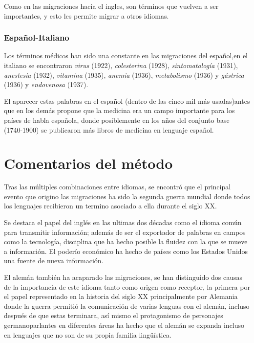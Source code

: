 Como en las migraciones hacia el ingles, son términos que vuelven a ser importantes,  y esto les permite migrar a otros idiomas. 


\subsubsection*{Español-Italiano}%

Los términos médicos han sido una constante en las migraciones del español,en el italiano se encontraron \textit{virus} (1922), \textit{colesterina} (1928),  \textit{sintomatología} (1931), \textit{anestesia} (1932), \textit{vitamina} (1935), \textit{anemia} (1936), \textit{metabolismo} (1936) y \textit{gástrica} (1936)  y \textit{endovenosa} (1937).  

El aparecer estas palabras en el español (dentro de las cinco mil más usadas)antes que en los demás propone que la medicina era un campo importante para los países de habla española, donde posiblemente en los años del conjunto base (1740-1900) se publicaron más libros de medicina en lenguaje español. 





\hfill\break
\hfill\break

\section{Comentarios del método}%


Tras las múltiples combinaciones entre idiomas, se  encontró que el principal
evento que origino las migraciones ha sido la segunda guerra mundial donde
todos los lenguajes recibieron un termino asociado a ella durante el siglo XX.

Se destaca el papel del inglés en las ultimas dos décadas como el idioma común
para transmitir información; además de ser el exportador de palabras en campos
como la tecnología, disciplina que ha hecho posible la fluidez con la que se
mueve a información. El poderío económico ha hecho de países como los Estados
Unidos una fuente de nueva información.

El alemán también ha acaparado las migraciones, se han distinguido dos causas
de la importancia de este idioma tanto como origen como receptor, la primera
por el papel representado en la historia del siglo XX principalmente por
Alemania donde la guerra permitió la comunicación de varias lenguas con el
alemán, incluso después de que estas terminara, así mismo el protagonismo de
personajes germanoparlantes en diferentes áreas ha hecho que el alemán se
expanda incluso en lenguajes que no son de su propia familia lingüística. 

